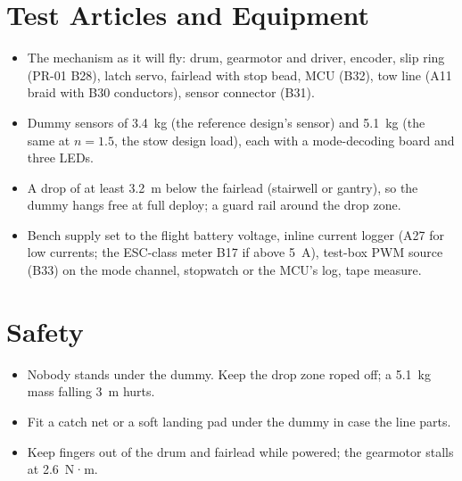 \documentclass[final]{dbfdoc}
\begin{document}
\section{Test Articles and Equipment}
\begin{itemize}
\item The mechanism as it will fly: drum, gearmotor and driver, encoder, slip ring (PR-01 B28), latch servo, fairlead with stop bead, MCU (B32), tow line (A11 braid with B30 conductors), sensor connector (B31).
\item Dummy sensors of 3.4~kg (the reference design's sensor) and 5.1~kg (the same at $n = 1.5$, the stow design load), each with a mode-decoding board and three LEDs.
\item A drop of at least 3.2~m below the fairlead (stairwell or gantry), so the dummy hangs free at full deploy; a guard rail around the drop zone.
\item Bench supply set to the flight battery voltage, inline current logger (A27 for low currents; the ESC-class meter B17 if above 5~A), test-box PWM source (B33) on the mode channel, stopwatch or the MCU's log, tape measure.
\end{itemize}

\section{Safety}
\begin{itemize}
\item Nobody stands under the dummy. Keep the drop zone roped off; a 5.1~kg mass falling 3~m hurts.
\item Fit a catch net or a soft landing pad under the dummy in case the line parts.
\item Keep fingers out of the drum and fairlead while powered; the gearmotor stalls at 2.6~N·m.
\end{itemize}
\end{document}
